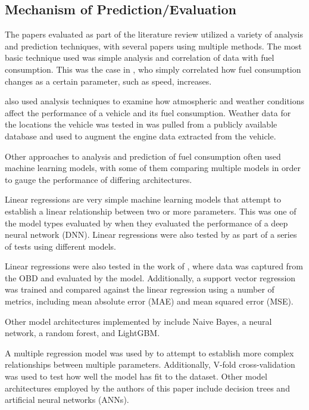 \documentclass[letterpaper]{article}
\begin{document}

\subsection*{Mechanism of Prediction/Evaluation}

The papers evaluated as part of the literature review utilized a variety of
analysis and prediction techniques, with several papers using multiple methods.
The most basic technique used was simple analysis and correlation of data with
fuel consumption. This was the case in \cite{al2007experimental}, who
simply correlated how fuel consumption changes as a certain parameter, such as
speed, increases. 

\cite{filla2025using} also used analysis techniques to
examine how atmospheric and weather conditions affect the performance of a
vehicle and its fuel consumption. Weather data for the locations the vehicle was
tested in was pulled from a publicly available database and used to augment the
engine data extracted from the vehicle. 

Other approaches to analysis and prediction of fuel consumption often used machine 
learning models, with some of them comparing multiple models in order to gauge the 
performance of differing architectures. 

Linear regressions are very simple machine  learning models that attempt to establish 
a linear relationship between two or more  parameters. This was one of the model types 
evaluated by \cite{topic2022neural} when they evaluated the performance of a deep 
neural network (DNN). Linear regressions were also tested by \cite{yang2022predicting} 
as part of a series of tests using different models. 

Linear regressions were also tested in the work of
\cite{Manjunath2024}, where data was captured from the OBD and evaluated by the
model. Additionally, a support vector regression was trained and compared
against the linear regression using a number of metrics, including mean absolute
error (MAE) and mean squared error (MSE). 

Other model architectures implemented by \cite{yang2022predicting} include Naive Bayes, 
a neural network, a random forest, and LightGBM. 

A multiple regression model was used by \cite{rykala2023modeling} to attempt to establish 
more complex relationships between multiple parameters. Additionally, V-fold cross-validation 
was used to test how well the model has fit to the dataset. Other model architectures
employed by the authors of this paper include decision trees and artificial
neural networks (ANNs). 
\end{document}
